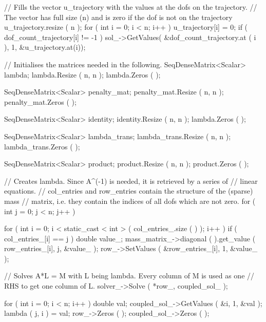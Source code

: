 \documentclass[a4paper, 11pt, twoside]{article}
\begin{document}
	\begin{code}[caption={Computes the synthetic measurement data $u_d$.}, label=sc:ud]
    // Fills the vector u_trajectory with the values at the dofs on the trajectory.
    // The vector has full size (n) and is zero if the dof is not on the trajectory
    u_trajectory.resize ( n );
    for ( int i = 0; i < n; i++ )
    {
        u_trajectory[i] = 0;
        if ( dof_count_trajectory[i] != -1 )
        {
            sol_->GetValues( &dof_count_trajectory.at ( i ), 1, &u_trajectory.at(i));
        }
    }

    // Initialises the matrices needed in the following.
    SeqDenseMatrix<Scalar> lambda;
    lambda.Resize ( n, n );
    lambda.Zeros ( );

    SeqDenseMatrix<Scalar> penalty_mat;
    penalty_mat.Resize ( n, n );
    penalty_mat.Zeros ( );

    SeqDenseMatrix<Scalar> identity;
    identity.Resize ( n, n );
    lambda.Zeros ( );

    SeqDenseMatrix<Scalar> lambda_trans;
    lambda_trans.Resize ( n, n );
    lambda_trans.Zeros ( );

    SeqDenseMatrix<Scalar> product;
    product.Resize ( n, n );
    product.Zeros ( );
	\end{code}
	\begin{code}[caption={Creates $\Lambda$.}, label=sc:lambda]
    // Creates lambda. Since A^(-1) is needed, it is retrieved by a series of
    // linear equations.
    // col_entries and row_entries contain the structure of the (sparse) mass
    // matrix, i.e. they contain the indices of all dofs which are not zero.
    for ( int j = 0; j < n; j++ )
    {
        for ( int i = 0; i < static_cast < int > ( col_entries_.size ( ) ); i++ )
        {
            if ( col_entries_[i] == j )
            {
                double value_;
                mass_matrix_->diagonal ( ).get_value ( row_entries_[i], j, &value_ );
                row_->SetValues ( &row_entries_[i], 1, &value_ );
            }
        }

        // Solves A*L = M with L being lambda. Every column of M is used as one
        // RHS to get one column of L.
        solver_->Solve ( *row_, coupled_sol_ );

        for ( int i = 0; i < n; i++ )
        {
            double val;
            coupled_sol_->GetValues ( &i, 1, &val );
            lambda ( j, i ) = val;
        }
        row_->Zeros ( );
        coupled_sol_->Zeros ( );
    }
	\end{code}
\end{document}
